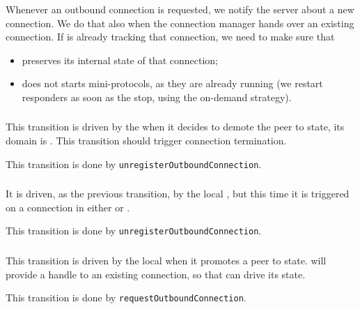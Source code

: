 \begin{detail}
  Whenever an outbound connection is requested, we notify the server about
  a new connection.  We do that also when the connection manager hands over an
  existing connection.  If \inbgov{} is already tracking that connection,
  we need to make sure that
  \begin{itemize}
    \item \inbgov{} preserves its internal state of that connection;
    \item \inbgov{} does not starts mini-protocols, as they are already running
      (we restart responders as soon as the stop, using the on-demand
      strategy).
  \end{itemize}
\end{detail}


\subsubsection{\DemotedToColdUniLoc{}}
This transition is driven by the \ptopgov{} when it decides to demote the peer
to \cold{} state, its domain is \OutboundStateUni{}. This transition should
trigger connection termination.

\begin{detail}
This transition is done by \texttt{unregisterOutboundConnection}.
\end{detail}


\subsubsection{\DemotedToColdDupLoc{}}
It is driven, as the previous transition, by the local \ptopgov{}, but this time it is
triggered on a connection in either \OutboundStateDup{} or \DuplexState{}.

\begin{detail}
This transition is done by \texttt{unregisterOutboundConnection}.
\end{detail}


\subsubsection{\PromotedToWarmDupLoc{}}
This transition is driven by the local \ptopgov{} when it promotes a \cold{} peer
to \warm{} state. \connmngr{} will provide a handle to an existing connection, so that
\ptopgov{} can drive its state.

\begin{detail}
This transition is done by \texttt{requestOutboundConnection}.
\end{detail}


